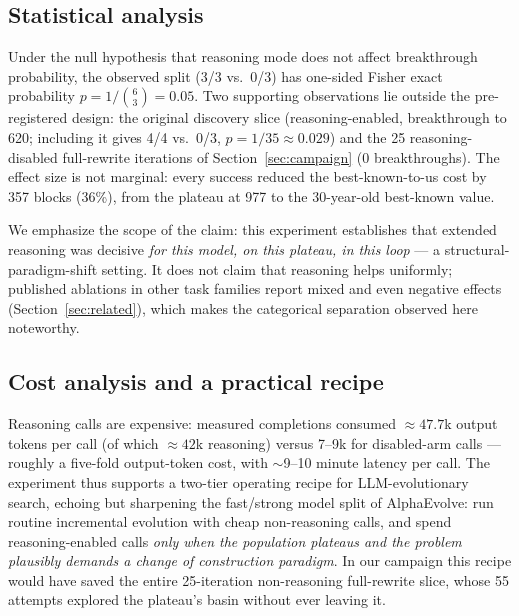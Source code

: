 \subsection{Statistical analysis}

Under the null hypothesis that reasoning mode does not affect
breakthrough probability, the observed split (3/3 vs.\ 0/3) has
one-sided Fisher exact probability $p = 1/\binom{6}{3} = 0.05$. Two
supporting observations lie outside the pre-registered design: the
original discovery slice (reasoning-enabled, breakthrough to 620;
including it gives 4/4 vs.\ 0/3, $p = 1/35 \approx 0.029$) and the 25
reasoning-disabled full-rewrite iterations of
Section~\ref{sec:campaign} (0 breakthroughs). The effect size is not
marginal: every success reduced the best-known-to-us cost by 357
blocks (36\%), from the plateau at 977 to the 30-year-old best-known
value.

We emphasize the scope of the claim: this experiment establishes that
extended reasoning was decisive \emph{for this model, on this
plateau, in this loop} --- a structural-paradigm-shift setting. It
does not claim that reasoning helps uniformly; published ablations in
other task families report mixed and even negative effects
(Section~\ref{sec:related}), which makes the categorical separation
observed here noteworthy.

\subsection{Cost analysis and a practical recipe}

Reasoning calls are expensive: measured completions consumed
${\approx}47.7$k output tokens per call (of which ${\approx}42$k
reasoning) versus 7--9k for disabled-arm calls --- roughly a
five-fold output-token cost, with ${\sim}$9--10 minute latency per
call. The experiment thus supports a two-tier operating recipe for
LLM-evolutionary search, echoing but sharpening the fast/strong model
split of AlphaEvolve: run routine incremental evolution with cheap
non-reasoning calls, and spend reasoning-enabled calls \emph{only
when the population plateaus and the problem plausibly demands a
change of construction paradigm}. In our campaign this recipe would
have saved the entire 25-iteration non-reasoning full-rewrite slice,
whose 55 attempts explored the plateau's basin without ever leaving
it.
